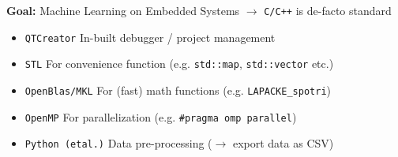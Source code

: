 \documentclass[aspectratio=169,10pt]{beamer}
\begin{document}
\begin{frame}[fragile]{\textbf{Goal:} Machine Learning on Embedded Systems $\to$ \texttt{C/C++} is de-facto standard}
    \begin{itemize}
         \item \texttt{QTCreator} In-built debugger / project management \pause
         \item \texttt{STL} For convenience function (e.g. \texttt{std::map}, \texttt{std::vector} etc.) \pause
         \item \texttt{OpenBlas/MKL} For (fast) math functions (e.g. \texttt{LAPACKE\_spotri}) \pause
         \item \texttt{OpenMP} For parallelization (e.g. \texttt{\#pragma omp parallel}) \pause
         \item \texttt{Python (etal.)} Data pre-processing ($\to$ export data as CSV)
     \end{itemize} 
\end{frame}
\end{document}
